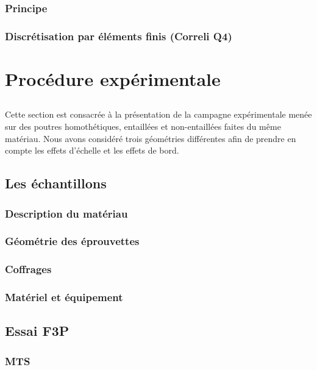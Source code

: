 \documentclass[12pt]{report}
\begin{document}
\section{Principe}


\section{Discrétisation par éléments finis (Correli Q4)}


\part{Procédure expérimentale}
\chapter*{}
Cette section est consacrée à la présentation de la campagne expérimentale menée sur des
poutres homothétiques, entaillées et non-entaillées faites du même matériau. Nous avons
considéré trois géométries différentes afin de prendre en compte les effets d’échelle et les effets
de bord.

\chapter{Les échantillons}
\section{Description du matériau}


\section{Géométrie des éprouvettes}


\section{Coffrages}


\section{Matériel et équipement}


\chapter{Essai F3P}
\section{MTS}
\end{document}
